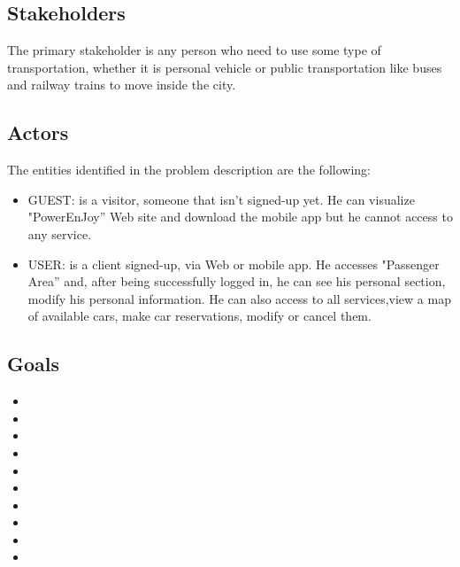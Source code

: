 \subsection{Stakeholders}
	The primary stakeholder is any person who need to use some type of transportation, whether it is personal vehicle or public transportation like buses and railway trains to move inside the city.


\subsection{Actors}
The entities identified in the problem description are the following: 
\begin{itemize}
	\item GUEST: is a visitor, someone that isn't signed-up yet. He can visualize
	"PowerEnJoy'' Web site and download the mobile app but he cannot
	access to any service.
	\item USER: is a client signed-up, via Web or mobile app. He accesses
	"Passenger Area'' and, after being successfully logged in, he can see
	his personal section, modify his personal information. He can also
	access to all services,view a map of available cars, make car reservations, modify or
	cancel them.
\end{itemize}

\subsection{Goals}
\begin{itemize}
	\item {}
	\item {}
	\item {}
	\item {}
	\item {}
	\item {}
	\item {}
	\item {}
	\item {}
	\item {}
\end{itemize}



\pagebreak{}


